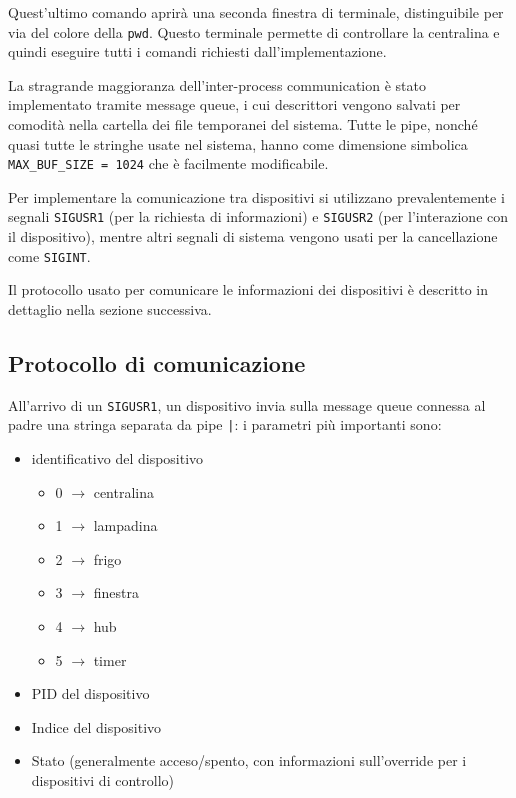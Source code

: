 \documentclass[11pt]{article}
\begin{document}
Quest'ultimo comando aprirà una seconda finestra di terminale, distinguibile per via del colore della \verb|pwd|. Questo terminale permette di controllare la centralina e quindi eseguire tutti i comandi richiesti dall'implementazione.

La stragrande maggioranza dell'inter-process communication è stato implementato tramite message queue, i cui descrittori vengono salvati per comodità nella cartella dei file temporanei del sistema. Tutte le pipe, nonché quasi tutte le stringhe usate nel sistema, hanno come dimensione simbolica \verb|MAX_BUF_SIZE = 1024| che è facilmente modificabile.

Per implementare la comunicazione tra dispositivi si utilizzano prevalentemente i segnali \verb|SIGUSR1| (per la richiesta di informazioni) e \verb|SIGUSR2| (per l'interazione con il dispositivo), mentre altri segnali di sistema vengono usati per la cancellazione come \verb|SIGINT|.

Il protocollo usato per comunicare le informazioni dei dispositivi è descritto in dettaglio nella sezione successiva.

\subsection{Protocollo di comunicazione}

All'arrivo di un \verb|SIGUSR1|, un dispositivo invia sulla message queue connessa al padre una stringa separata da pipe \verb=|=: i parametri più importanti sono:

\begin{itemize}
    \item identificativo del dispositivo
          \begin{itemize}
              \item 0 $\rightarrow$ centralina
              \item 1 $\rightarrow$ lampadina
              \item 2 $\rightarrow$ frigo
              \item 3 $\rightarrow$ finestra
              \item 4 $\rightarrow$ hub
              \item 5 $\rightarrow$ timer
          \end{itemize}
    \item PID del dispositivo
    \item Indice del dispositivo
    \item Stato (generalmente acceso/spento, con informazioni sull'override per i dispositivi di controllo)
\end{itemize}
\end{document}
